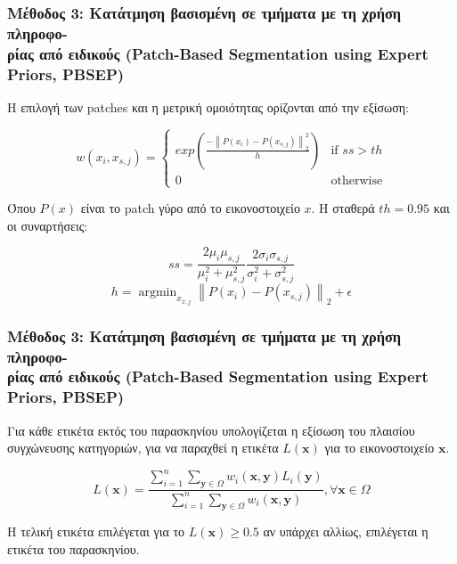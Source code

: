 \documentclass{beamer}
\newcommand{\argminB}{\mathop{\mathrm{argmin}}}
\newcommand\norm[1]{\left\lVert#1\right\rVert}
\begin{document}
\begin{frame}
\frametitle{\normalsize Μέθοδος 3: Κατάτμηση βασισμένη σε τμήματα με τη χρήση
πληροφο-\\ρίας από ειδικούς (Patch-Based Segmentation using Expert Priors, PBSEP)}

Η επιλογή των patches και η μετρική ομοιότητας ορίζονται από την εξίσωση:

\begin{equation*}
    w(x_i, x_{s,j}) = 
    \begin{cases}
        exp\left( \frac {- \norm{P(x_i) - P(x_{s,j})}_2^2 } {h} \right)
            & \text{if } ss > th\\
        0   & \text{otherwise}
    \end{cases}
\end{equation*}

Όπου $P(x)$ είναι το patch γύρο από το εικονοστοιχείο $x$. Η σταθερά $th = 0.95$
και οι συναρτήσεις:

\begin{equation*}
    ss = \frac {2 \mu_i \mu_{s,j}} {\mu_i^2 + \mu_{s,j}^2} 
         \frac {2 \sigma_i \sigma_{s,j}} {\sigma_i^2 + \sigma_{s,j}^2}
\end{equation*}
\begin{equation*}
    h = \argminB_{x_{x,j}} \norm{P(x_i) - P(x_{s,j})}_2 + \epsilon
\end{equation*}

\end{frame}


\begin{frame}
\frametitle{\normalsize Μέθοδος 3: Κατάτμηση βασισμένη σε τμήματα με τη χρήση
πληροφο-\\ρίας από ειδικούς (Patch-Based Segmentation using Expert Priors, PBSEP)}

Για κάθε ετικέτα εκτός του παρασκηνίου υπολογίζεται η εξίσωση του πλαισίου
συγχώνευσης κατηγοριών, για να παραχθεί η ετικέτα $L(\bm{x})$ για το
εικονοστοιχείο $\bm{x}$.

\begin{equation*}
    L(\bm{x})=\frac{ \sum_{i=1}^{n}  \sum_{\bm{y}\in\Omega}
                     w_i(\bm{x},\bm{y})L_i(\bm{y})}
    { \sum_{i=1}^{n}  \sum_{\bm{y}\in\Omega} w_i(\bm{x},\bm{y}) }
    , \forall \bm{x}\in\Omega
\end{equation*}

Η τελική ετικέτα επιλέγεται για το $L(\bm{x}) \geq 0.5$ αν υπάρχει αλλίως,
επιλέγεται η ετικέτα του παρασκηνίου.

\end{frame}
\end{document}
